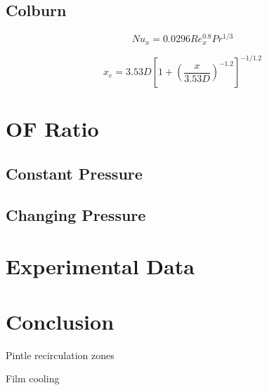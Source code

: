 \documentclass[11pt]{article}
\begin{document}
\subsection{Colburn}

\begin{equation}
  Nu_x = 0.0296 Re_x^{0.8} Pr^{1/3}
\end{equation}

\begin{equation}
  x_e = 3.53D \left[ 1 + \left( \frac{x}{3.53D} \right)^{-1.2}\right]^{-1/1.2}
\end{equation}

\section{OF Ratio}

\subsection{Constant Pressure}

\subsection{Changing Pressure}

\section{Experimental Data}


\section{Conclusion}

Pintle recirculation zones

Film cooling
\end{document}
